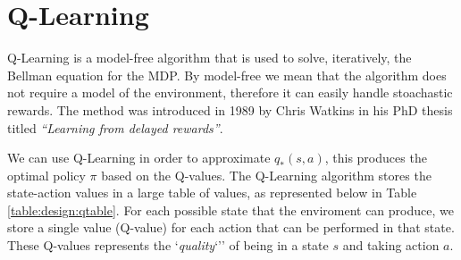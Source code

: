 \newpage

\section{Q-Learning}
\label{dsgn:sec:qlearning}
Q-Learning is a model-free algorithm that is used to solve, iteratively, the Bellman equation for the MDP. By model-free we mean that the algorithm does not require a model of the environment, therefore it can easily handle stoachastic rewards. The method was introduced in 1989 by Chris Watkins in his PhD thesis titled \textit{``Learning from delayed rewards''}.

We can use Q-Learning in order to approximate $q_*(s, a)$, this produces the optimal policy $\pi$ based on the Q-values. The Q-Learning algorithm stores the state-action values in a large table of values, as represented below in Table \ref{table:design:qtable}. For each possible state that the enviroment can produce, we store a single value (Q-value) for each action that can be performed in that state. These Q-values represents the `\textit{quality}`'' of being in a state $s$ and taking action $a$.

